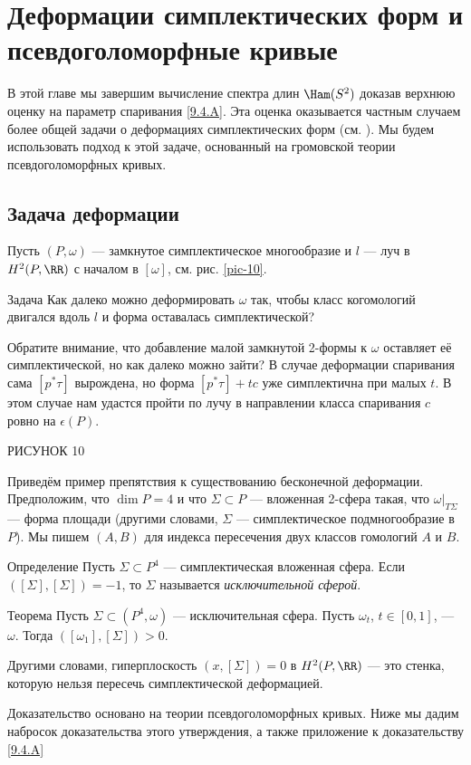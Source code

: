 \chapter{Деформации симплектических форм и псевдоголоморфные кривые}

В этой главе мы завершим вычисление спектра длин $\Ham(S^2)$ доказав верхнюю оценку на параметр спаривания \ref{9.4.A}.
Эта оценка оказывается частным случаем более общей задачи о деформациях симплектических форм (см. \cite{P7}).
Мы будем использовать подход к этой задаче, основанный на громовской теории псевдоголоморфных кривых.

\section{Задача деформации}

Пусть $(P, \omega)$ --- замкнутое симплектическое многообразие и $l$ --- луч в $H^2 (P, \RR)$ с началом в $[\omega]$, см. рис. \ref{pic-10}.

\begin{thm*}{Задача}
Как далеко можно деформировать $\omega$ так, чтобы класс когомологий двигался вдоль $l$ и форма оставалась симплектической? 
\end{thm*}

Обратите внимание, что добавление малой замкнутой 2-формы к $\omega$ оставляет её симплектической, но как далеко можно зайти?
В случае деформации спаривания сама  $[p^\ast \tau]$ вырождена, но форма $[p^\ast \tau ] + tc$ уже симплектична при малых $t$.
В этом случае нам удастся пройти по лучу в направлении класса спаривания $c$ ровно на $\epsilon(P)$.

РИСУНОК 10


Приведём пример препятствия к существованию бесконечной деформации.
Предположим, что $\dim P = 4$ и что $\Sigma \subset P$ --- вложенная 2-сфера такая, что $\omega|_{T \Sigma}$ --- форма площади (другими словами, $\Sigma$ --- симплектическое подмногообразие в $P$).
Мы пишем $(A, B)$ для индекса пересечения двух классов гомологий $A$ и $B$.

\begin{thm*}{Определение}
Пусть $\Sigma \subset P^4$ --- симплектическая вложенная сфера.
Если $([\Sigma], [\Sigma]) = −1$, то $\Sigma$ называется \emph{исключительной сферой}.
\end{thm*}

\begin{thm}{Теорема}\label{10.1.A}
Пусть $\Sigma \subset (P^4, \omega)$ --- исключительная сфера.
Пусть $\omega_t$, $t \in [0, 1]$, ---  $\omega$.
Тогда $([\omega_1 ], [\Sigma]) > 0$.
\end{thm}

Другими словами, гиперплоскость $(x, [\Sigma]) = 0$ в $H^2 (P, \RR)$ --- это стенка, которую нельзя пересечь симплектической деформацией.

Доказательство основано на теории псевдоголоморфных кривых.
Ниже мы дадим набросок доказательства этого утверждения, а также приложение к доказательству \ref{9.4.A}
